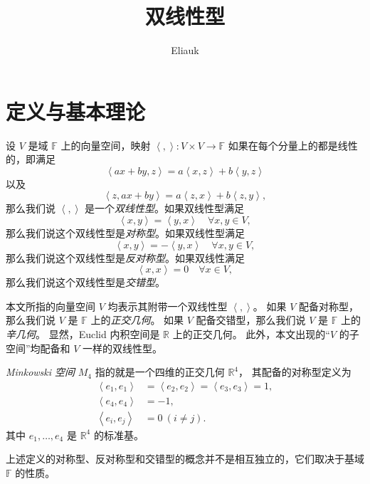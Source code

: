 \documentclass[fontset=none,zihao=-4]{Notes}
\title{\sffamily 双线性型}
\author{Eliauk}
\newcommand{\inn}[1]{\left\langle#1\right\rangle}
\begin{document}
\maketitle

\tableofcontents

\section{定义与基本理论}

设 $V$ 是域 $\mathbb{F}$ 上的向量空间，映射 $\inn{,}:V\times V\to \mathbb{F}$
如果在每个分量上的都是线性的，即满足
\[
  \inn{ax+by,z}=a\inn{x,z}+b\inn{y,z}  
\]
以及
\[
  \inn{z,ax+by}=a\inn{z,x}+b\inn{z,y},  
\]
那么我们说 $\inn{,}$ 是一个\emph{双线性型}。如果双线性型满足
\[
  \inn{x,y}=\inn{y,x} \quad\forall x,y\in V,  
\]
那么我们说这个双线性型是\emph{对称型}。如果双线性型满足
\[
  \inn{x,y}=-\inn{y,x}  \quad\forall x,y\in V,  
\]
那么我们说这个双线性型是\emph{反对称型}。如果双线性满足
\[
  \inn{x,x}=0\quad \forall x\in V,  
\]
那么我们说这个双线性型是\emph{交错型}。

本文所指的向量空间 $V$ 均表示其附带一个双线性型 $\inn{,}$。
如果 $V$ 配备对称型，那么我们说 $V$ 是 $\mathbb{F}$ 上的\emph{正交几何}。
如果 $V$ 配备交错型，那么我们说 $V$ 是 $\mathbb{F}$ 上的\emph{辛几何}。
显然，Euclid 内积空间是 $\mathbb{R}$ 上的正交几何。
此外，本文出现的“$V$ 的子空间”均配备和 $V$ 一样的双线性型。

\begin{example}
  \emph{Minkowski 空间} $M_4$ 指的就是一个四维的正交几何 $\mathbb{R}^4$，
  其配备的对称型定义为
  \begin{align*}
    \inn{e_1,e_1}&=\inn{e_2,e_2}=\inn{e_3,e_3}=1 ,\\
    \inn{e_4,e_4}&=-1,\\
    \inn{e_i,e_j}&=0  \ (i\neq j).
  \end{align*}
  其中 $e_1,\dots,e_4$ 是 $\mathbb{R}^4$ 的标准基。
\end{example}

上述定义的对称型、反对称型和交错型的概念并不是相互独立的，它们取决于基域
$\mathbb{F}$ 的性质。
\end{document}
